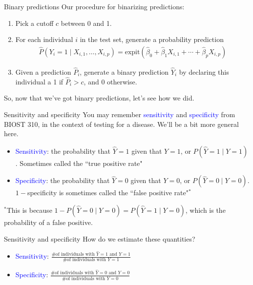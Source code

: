 \documentclass[10pt,t]{beamer}
\begin{document}
\begin{frame}{Binary predictions}
	Our procedure for binarizing predictions: 
	\medskip
	\begin{enumerate}
		\item Pick a cutoff $c$ between 0 and 1. 
		\medskip
		
		\item For each individual $i$ in the test set, generate a probability prediction 
		\begin{align*}
			\widehat{P}(Y_i = 1 \mid X_{i,1}, \dots, X_{i,p}) = \text{expit}(\hat{\beta}_0 + \hat{\beta}_1X_{i,1} + \cdots + \hat{\beta}_pX_{i,p})
		\end{align*}  
		\item Given a prediction $\hat{P}_i$, generate a binary prediction $\hat{Y}_i$ by declaring this individual a 1 if $\hat{P}_i> c$, and 0 otherwise.  
	\end{enumerate}
\medskip
	So, now that we've got binary predictions, let's see how we did. 
\end{frame}

\begin{frame}{Sensitivity and specificity}
	You may remember \textcolor{blue}{sensitivity} and \textcolor{blue}{specificity} from BIOST 310, in the context of testing for a disease. We'll be a bit more general here.  
	
	\medskip
	\begin{itemize}
		\item \textcolor{blue}{Sensitivity}: the probability that $\hat{Y} = 1$ given that $Y = 1$, or $P(\hat{Y}= 1 \mid Y = 1)$. Sometimes called the ``true positive rate" 
		
		\medskip
		\item \textcolor{blue}{Specificity}: the probability that $\hat{Y}= 0$ given that $Y = 0$, or $P(\hat{Y} = 0 \mid Y = 0)$. $1 - $specificity is sometimes called the ``false positive rate"$^*$ 
	\end{itemize}
	
\medskip
 $^*$This is because $1 - P(\hat{Y}= 0 \mid Y = 0) = P(\hat{Y}= 1 \mid Y = 0)$, which is the probability of a false positive. 
\end{frame}

\begin{frame}{Sensitivity and specificity}
	How do we estimate these quantities? 
	
	\medskip
	
	\begin{itemize}
		\item \textcolor{blue}{Sensitivity}: $\frac{\text{\# of individuals with }\hat{Y}= 1 \text{ and } Y = 1}{\text{\# of individuals with }Y = 1}$ 
		
		\medskip
		
		\item \textcolor{blue}{Specificity}: $\frac{\text{\# of individuals with }\hat{Y}= 0 \text{ and } Y = 0}{\text{\# of individuals with }Y = 0}$ 
	\end{itemize}
\end{frame}
\end{document}
